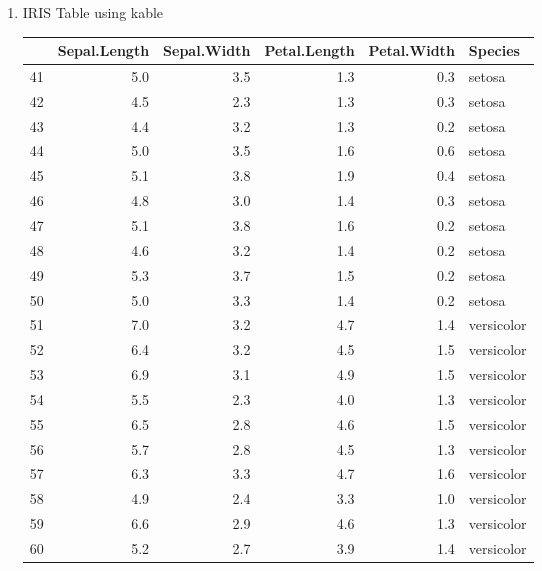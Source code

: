 \documentclass[a4paper]{article}
\begin{document}
\begin{enumerate}
\begin{enumerate}
				\item IRIS Table using kable\par

					
\begin{tabular}{l|r|r|r|r|l}
\hline
  & Sepal.Length & Sepal.Width & Petal.Length & Petal.Width & Species\\
\hline
41 & 5.0 & 3.5 & 1.3 & 0.3 & setosa\\
\hline
42 & 4.5 & 2.3 & 1.3 & 0.3 & setosa\\
\hline
43 & 4.4 & 3.2 & 1.3 & 0.2 & setosa\\
\hline
44 & 5.0 & 3.5 & 1.6 & 0.6 & setosa\\
\hline
45 & 5.1 & 3.8 & 1.9 & 0.4 & setosa\\
\hline
46 & 4.8 & 3.0 & 1.4 & 0.3 & setosa\\
\hline
47 & 5.1 & 3.8 & 1.6 & 0.2 & setosa\\
\hline
48 & 4.6 & 3.2 & 1.4 & 0.2 & setosa\\
\hline
49 & 5.3 & 3.7 & 1.5 & 0.2 & setosa\\
\hline
50 & 5.0 & 3.3 & 1.4 & 0.2 & setosa\\
\hline
51 & 7.0 & 3.2 & 4.7 & 1.4 & versicolor\\
\hline
52 & 6.4 & 3.2 & 4.5 & 1.5 & versicolor\\
\hline
53 & 6.9 & 3.1 & 4.9 & 1.5 & versicolor\\
\hline
54 & 5.5 & 2.3 & 4.0 & 1.3 & versicolor\\
\hline
55 & 6.5 & 2.8 & 4.6 & 1.5 & versicolor\\
\hline
56 & 5.7 & 2.8 & 4.5 & 1.3 & versicolor\\
\hline
57 & 6.3 & 3.3 & 4.7 & 1.6 & versicolor\\
\hline
58 & 4.9 & 2.4 & 3.3 & 1.0 & versicolor\\
\hline
59 & 6.6 & 2.9 & 4.6 & 1.3 & versicolor\\
\hline
60 & 5.2 & 2.7 & 3.9 & 1.4 & versicolor\\
\hline
\end{tabular}

	
			\end{enumerate}			
	\end{enumerate}
\end{document}
